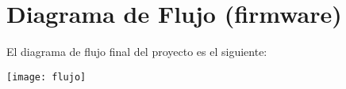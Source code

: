 \section{Diagrama de Flujo  (firmware)}
El diagrama de flujo final del proyecto es el siguiente:
\begin{center}
    \texttt{[image: flujo]}
\end{center}



